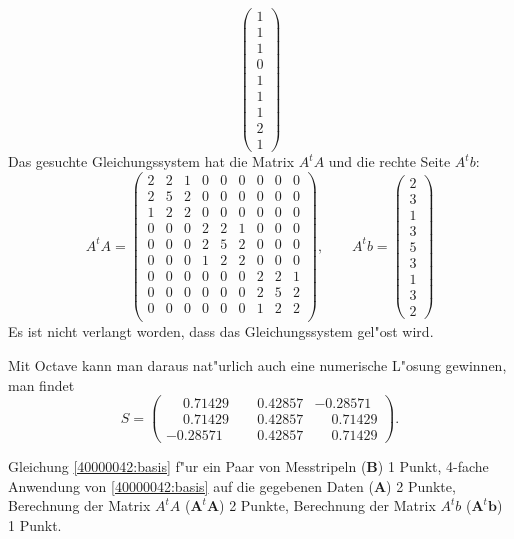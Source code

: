 \begin{loesung}
\[\begin{pmatrix}
1\\1\\1\\
0\\1\\1\\
1\\2\\1
\end{pmatrix}
\]
Das gesuchte Gleichungssystem hat die Matrix $A^tA$ und die rechte
Seite $A^tb$:
\[
A^tA
=
\begin{pmatrix}
2&2&1&0&0&0&0&0&0\\
2&5&2&0&0&0&0&0&0\\
1&2&2&0&0&0&0&0&0\\
%
0&0&0&2&2&1&0&0&0\\
0&0&0&2&5&2&0&0&0\\
0&0&0&1&2&2&0&0&0\\
%
0&0&0&0&0&0&2&2&1\\
0&0&0&0&0&0&2&5&2\\
0&0&0&0&0&0&1&2&2\\
\end{pmatrix}
,\qquad
A^tb=\begin{pmatrix}2\\3\\1\\3\\5\\3\\1\\3\\2\end{pmatrix}
\]
Es ist nicht verlangt worden, dass das Gleichungssystem gel"ost wird.
\end{loesung}

\begin{diskussion}
Mit Octave kann man daraus nat"urlich auch eine numerische L"osung gewinnen,
man findet
\[
S=\begin{pmatrix}
\phantom{-}0.71429& \phantom{-}0.42857&           -0.28571\\
\phantom{-}0.71429& \phantom{-}0.42857& \phantom{-}0.71429\\
          -0.28571& \phantom{-}0.42857& \phantom{-}0.71429
\end{pmatrix}.
\]
\end{diskussion}

\begin{bewertung}
Gleichung \eqref{40000042:basis} f"ur ein Paar von Messtripeln ({\bf B})
1 Punkt,
4-fache Anwendung von \eqref{40000042:basis} auf die gegebenen Daten ({\bf A})
2 Punkte,
Berechnung der Matrix $A^tA$ ($\textbf{A}^t\textbf{A}$) 2 Punkte,
Berechnung der Matrix $A^tb$ ($\textbf{A}^t\textbf{b}$) 1 Punkt.

\end{bewertung}


